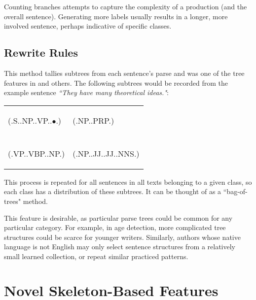 \documentclass[conference]{IEEEtran}
\begin{document}
Counting branches attempts to capture the complexity of a production (and the
overall sentence). Generating more labels usually results in a longer, more
involved sentence, perhaps indicative of specific classes.

\subsection{Rewrite Rules}

This method tallies subtrees from each sentence's parse and was one of the tree
features in \cite{sigir-kim-2011} and others. The following subtrees
would be recorded from the example sentence \emph{``They have many theoretical
ideas."}:

\begin{center}
\begin{tabular}{ll}
    \begin{parsetree}
        (.S..NP..VP..$\bullet$.)
    \end{parsetree} &
    \begin{parsetree}
        (.NP..PRP.)
    \end{parsetree} \\
     &  \\ %
    \begin{parsetree}
        (.VP..VBP..NP.)
    \end{parsetree} &
    \begin{parsetree}
        (.NP..JJ..JJ..NNS.)
    \end{parsetree} \\
\end{tabular}
\end{center}

This process is repeated for all sentences in all texts belonging to a given
class, so each class has a distribution of these subtrees. It can be thought of
as a ``bag-of-trees" method.

This feature is desirable, as particular parse trees could be common for any
particular category. For example, in age detection, more complicated tree
structures could be scarce for younger writers.  Similarly, authors whose native
language is not English may only select sentence structures from a relatively
small learned collection, or repeat similar practiced patterns.

\section{Novel Skeleton-Based Features}
\end{document}
